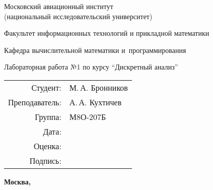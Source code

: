 \documentclass[pdf, unicode, 12pt, a4paper,oneside,fleqn]{article}
\begin{document}
\begin{titlepage}
    \begin{center}
    \bfseries
    
    {\Large Московский авиационный институт\\ (национальный исследовательский университет)
    
    }
    
    \vspace{48pt}
    
    {\large Факультет информационных технологий и прикладной математики
    }
    
    \vspace{36pt}
    
    
    {\large Кафедра вычислительной математики и~программирования
    
    }
    
    
    \vspace{48pt}
    
    Лабораторная работа №1 по курсу \enquote{Дискретный анализ}
    
    \end{center}
    
    \vspace{72pt}
    
    \begin{flushright}
    \begin{tabular}{rl}
    Студент: & М.\,А. Бронников \\
    Преподаватель: & А.\,А. Кухтичев \\
    Группа: & М8О-207Б \\
    Дата: & \\
    Оценка: & \\
    Подпись: & \\
    \end{tabular}
    \end{flushright}
    
    \vfill
    
    \begin{center}
    \bfseries
    Москва, \the\year
    \end{center}
    \end{titlepage}
    
    \pagebreak


\pagebreak
\end{document}
